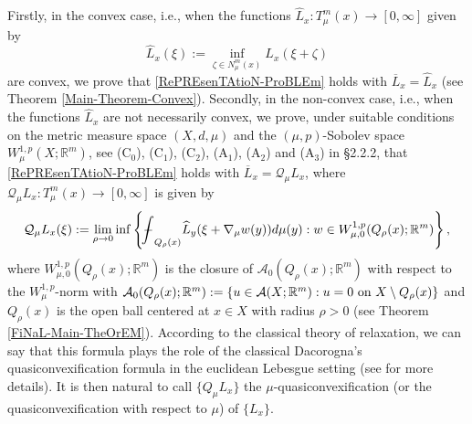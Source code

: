 \documentclass[10pt]{amsart}
\numberwithin{equation}{section}
\theoremstyle{definition}
\theoremstyle{remark}
\begin{document}
Firstly, in the convex case, i.e., when  the functions $\widehat{L}_x:T_\mu^m(x)\to[0,\infty]$ given by
$$
\widehat{L}_x(\xi):=\inf_{\zeta\in N_\mu^m(x)}L_x(\xi+\zeta)
$$
are convex, we prove that \eqref{RePREsenTAtioN-ProBLEm} holds with $\overline{L}_x=\widehat{L}_x$ (see Theorem \ref{Main-Theorem-Convex}). Secondly, in the non-convex case, i.e., when the functions $\widehat{L}_x$ are not necessarily convex, we prove, under suitable conditions on the metric measure space $(X,d,\mu)$ and the $(\mu,p)$-Sobolev space $W^{1,p}_\mu(X;{{\mathbb R}}^m)$, see {\rm (C$_0$)}, {\rm (C$_1$)}, {\rm (C$_2$)}, {\rm (A$_1$)}, {\rm (A$_2$)} and {\rm (A$_3$)} in \S 2.2.2, that  \eqref{RePREsenTAtioN-ProBLEm} holds with $\overline{L}_x=\mathcal{Q}_\mu L_x$, where $\mathcal{Q}_\mu L_x:T^m_\mu(x)\to[0,\infty]$ is given by
$$
\mathcal{Q}_\mu L_x(\xi):=\lim_{\rho\to 0}\inf\left\{{{{\bf-}\!\!\!\!\!\!\hspace{-.1em}\int}}_{Q_\rho(x)}\widehat{L}_y(\xi+\nabla_\mu w(y))d\mu(y):w\in W^{1,p}_{\mu,0}(Q_\rho(x);{{\mathbb R}}^m)\right\},
$$
where $W^{1,p}_{\mu,0}(Q_\rho(x);{{\mathbb R}}^m)$ is the closure of $\mathcal{A}_0(Q_\rho(x);{{\mathbb R}}^m)$ with respect to the $W^{1,p}_\mu$-norm with $\mathcal{A}_0(Q_\rho(x);{{\mathbb R}}^m):=\{u\in\mathcal{A}(X;{{\mathbb R}}^m):u=0\hbox{ on }X\setminus Q_\rho(x)\}$ and  $Q_\rho(x)$ is the open ball centered at $x\in X$ with radius $\rho>0$  (see Theorem \ref{FiNaL-Main-TheOrEM}). According to the classical theory of relaxation, we can say that this formula plays the role of the classical Dacorogna's quasiconvexification formula in the euclidean Lebesgue setting (see \cite{dacorogna08} for more details). It is then natural to call $\{Q_\mu L_x\}$ the $\mu$-quasiconvexification (or the quasiconvexification with respect to $\mu$) of $\{L_x\}$. 

\medskip
\end{document}
